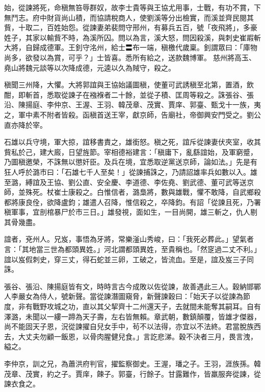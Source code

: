 \begin{pinyinscope}
 始，從諫將死，命稹無笞辱群奴，故李士貴等與王協尤用事，士戰，有功不賞，下無鬥志。府中財貨尚山積，而協請稅商人，使劉溪等分出檢實，而溪並齊民閱其貲，十取二，百姓始怨。從諫妻弟裴問守邢州，有募兵五百，號「夜飛將」，多豪姓子，其家以輸貲不時，為溪所囚。問以為言，溪大怒，問因殺溪，與刺史崔嘏斬大將，自歸成德軍。王釗守洺州，給士〓布一端，稹檄代歲稟。釗謂眾曰：「庫物尚多，欲發以為賞，可乎？」士皆喜。悉所有給之，送款魏博軍。慈州將高玉、堯山將魏元談等以次降成德，元逵以久為賊守，殺之。



 稹聞三州降，大懼。大將郭誼與王協始議圖稹，使董可武誘稹至北第，置酒，飲酣，即斬首，悉取從諫子在襁褓者二十餘，並從子積、匡周等殺之。誅張谷、張沿、陳揚庭、李仲京、王渥、王羽、韓茂章、茂實、賈庠、郭臺、甄戈十一族，夷之，軍中素不附者皆殺。函稹首送王宰，獻京師，告廟社，帝御興安門受之。劉公直亦降於宰。



 石雄以兵守境，軍大掠，誼移書責之，雄銜怒。稹之死，誼斥從諫妻伏夾室，收其貲私於己，建大廄，日望旌節。宰相德裕建言：「稹庸下，亂繇誼始，及軍窮蹙，乃圖稹邀榮，不誅無以懲奸臣。及兵在境，宜悉取逆黨送京師，論如法。」先是有狂人呼於潞市曰：「石雄七千人至矣！」從諫捕誅之，乃請詔雄率兵如數以入。雄至潞，縛誼及王協、劉公直、安全慶、李道德、李佐堯、劉武德、董可武等送京師，並殊死。杖崔士康殺之。白惟信者，潞梟將，數與雄戰，懼不敢降，自武鄉殺都將康良佺，欲降盧鈞；雄遣人召降，惟信殺之，卒降鈞。有詔「從諫且死，乃署稹軍事，宜剖棺暴尸於市三日。」雄發視，面如生，一目尚開，雄三斬之，仇人剔其骨幾盡。



 誼者，兗州人。兄岌，事悟為牙將，常樂滏山秀峻，曰：「我死必葬此。」望氣者言：「其地當三世為都頭異姓。」河北謂都頭異姓，至貴稱也。「然窆過二丈不利。」誼以岌假刺史，穿三丈，得石蛇並三卵，工破之，皆流血。至是，誼及岌三子同誅。



 張谷、張沿、陳揚庭皆有文，時時言古今成敗以佐從諫，故善遇此三人。穀納邯鄲人李嚴女為侍人，號新聲。當從諫潛圖窺脅，新聲諫穀曰：「始天子以從諫為節度，非有戰野攻城之功，直以其父挈齊十二州還天子，去就間未能奪其嗣耳。自有澤潞，未聞以一縷一蹄為天子壽，左右皆無賴。章武朝，數鎮顛覆，皆雄才傑器，尚不能固天子恩，況從諫擢自兒女手中，茍不以法得，亦宜以不法終。君當脫族西去，大丈夫勿顧一飯恩，以骨肉腥健兒食。」言訖悲涕。穀不決者三月，畏言洩，縊之。



 李仲京，訓之兄，為蕭洪府判官，擢監察御史。王渥，璠之子。王羽，涯族孫。韓茂章、茂實，約之子。賈庠，餗子。郭臺，行餘子。甘露難作，皆羸服奔從諫，從諫衣食之。




\end{pinyinscope}
